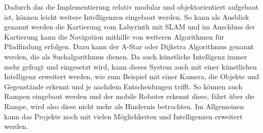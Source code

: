 Dadurch das die Implementierung relativ modular und objektorientiert aufgebaut ist, können leicht weitere Intelligenzen eingebaut werden. So kann als Ausblick genannt werden die Kartierung vom Labyrinth mit SLAM und im Anschluss der Kartierung kann die Navigation mithilfe von weiteren Algorithmen für Pfadfindung erfolgen. Dazu kann der A-Star oder Dijkstra Algorithmus genannt werden, die als Suchalgorithmus dienen. Da auch künstliche Intelligenz immer mehr gefragt und eingesetzt wird, kann dieses System auch mit einer künstlichen Intelligenz erweitert werden, wie zum Beispiel mit einer Kamera, die Objekte und Gegenstände erkennt und je nachdem Entscheidungen trifft. So können auch Rampen eingebaut werden und der mobile Roboter erkennt diese, fährt über die Rampe, wird also diese nicht mehr als Hindernis betrachten. Im Allgemeinen kann das Projekte noch mit vielen Möglichkeiten und Intelligenzen erweitert werden. 